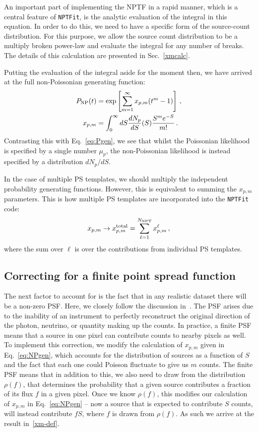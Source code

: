 An important part of implementing the NPTF in a rapid manner, which is a central feature of \texttt{NPTFit}, is the analytic evaluation of the integral in this equation. In order to do this, we need to have a specific form of the source-count distribution. For this purpose, we allow the source count distribution to be a multiply broken power-law and evaluate the integral for any number of breaks. The details of this calculation are presented in Sec.~\ref{xmcalc}. 

Putting the evaluation of the integral aside for the moment then, we have arrived at the full non-Poissonian generating function:
\begin{equation}\begin{aligned}
P_{\rm NP}(t) &= \exp \left[ \sum_{m=1}^{\infty} x_{p,m} (t^m - 1) \right]\,, \\
x_{p,m} &= \int_0^{\infty} dS \frac{dN_p}{dS}(S) \frac{S^m e^{-S}}{m!}\,.
\label{eq:NPgen}
\end{aligned}\end{equation}
Contrasting this with Eq.~\eqref{eq:Pgen}, we see that whilst the Poissonian likelihood is specified by a single number $\mu_p$, the non-Poissonian likelihood is instead specified by a distribution $dN_p/dS$.

In the case of multiple PS templates, we should multiply the independent probability generating functions.  However, this is equivalent to summing the $x_{p,m}$ parameters.  This is how multiple PS templates are incorporated into the \texttt{NPTFit} code:
\begin{equation}
x_{p,m} \to x_{p,m}^{\rm total} = \sum_{\ell=1}^{N_{\rm NPT}} x_{p,m}^{\ell}\,,
\end{equation}
where the sum over $\ell$ is over the contributions from individual PS templates. 

\subsection{Correcting for a finite point spread function}

The next factor to account for is the fact that in any realistic dataset there will be a non-zero PSF.  Here, we closely follow the discussion in~\cite{Malyshev:2011zi}. The PSF arises due to the inability of an instrument to perfectly reconstruct the original direction of the photon, neutrino, or quantity making up the counts. In practice, a finite PSF means that a source in one pixel can contribute counts to nearby pixels as well. To implement this correction, we modify the calculation of $x_{p,m}$ given in Eq.~\eqref{eq:NPgen}, which accounts for the distribution of sources as a function of $S$ and the fact that each one could Poisson fluctuate to give us $m$ counts. The finite PSF means that in addition to this, we also need to draw from the distribution $\rho(f)$, that determines the probability that a given source contributes a fraction of its flux $f$ in a given pixel. Once we know $\rho(f)$, this modifies our calculation of $x_{p,m}$ in Eq.~\eqref{eq:NPgen} -- now a source that is expected to contribute $S$ counts, will instead contribute $f S$, where $f$ is drawn from $\rho(f)$. As such we arrive at the result in~\eqref{xm-def}.

